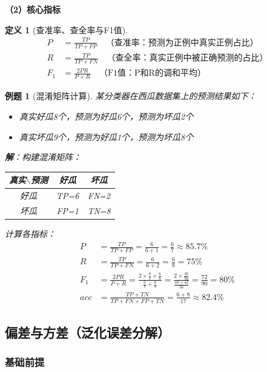 \documentclass[12pt,a4paper]{ctexart}
\newtheorem{definition}{定义}[section]
\newtheorem{exercise}{例题}[section]
\begin{document}
\textbf{（2）核心指标}

\begin{definition}[查准率、查全率与F1值]
\begin{align}
P &= \frac{TP}{TP + FP} \quad \text{（查准率：预测为正例中真实正例占比）} \\
R &= \frac{TP}{TP + FN} \quad \text{（查全率：真实正例中被正确预测的占比）} \\
F_1 &= \frac{2PR}{P + R} \quad \text{（F1值：P和R的调和平均）}
\end{align}
\end{definition}

\begin{exercise}[混淆矩阵计算]
某分类器在西瓜数据集上的预测结果如下：
\begin{itemize}
    \item 真实好瓜8个，预测为好瓜6个，预测为坏瓜2个
    \item 真实坏瓜9个，预测为好瓜1个，预测为坏瓜8个
\end{itemize}

\textbf{解}：构建混淆矩阵：
\begin{center}
\begin{tabular}{c|cc}
真实$\backslash$预测 & 好瓜 & 坏瓜 \\
\hline
好瓜 & TP=6 & FN=2 \\
坏瓜 & FP=1 & TN=8 \\
\end{tabular}
\end{center}

计算各指标：
\begin{align*}
P &= \frac{TP}{TP+FP} = \frac{6}{6+1} = \frac{6}{7} \approx 85.7\% \\
R &= \frac{TP}{TP+FN} = \frac{6}{6+2} = \frac{6}{8} = 75\% \\
F_1 &= \frac{2PR}{P+R} = \frac{2 \times \frac{6}{7} \times \frac{6}{8}}{\frac{6}{7} + \frac{6}{8}} = \frac{2 \times \frac{36}{56}}{\frac{48+42}{56}} = \frac{72}{90} = 80\% \\
acc &= \frac{TP+TN}{TP+FN+FP+TN} = \frac{6+8}{17} \approx 82.4\%
\end{align*}
\end{exercise}

\subsection{偏差与方差（泛化误差分解）}

\subsubsection{基础前提}
\end{document}

